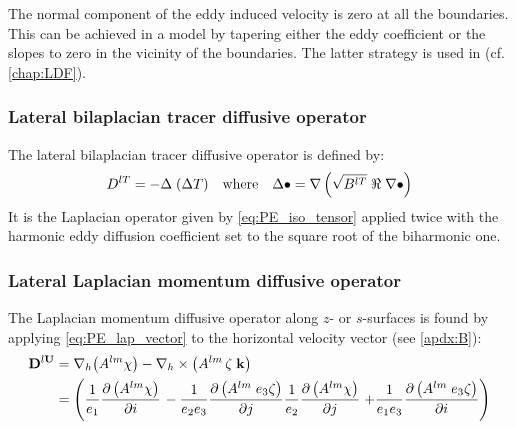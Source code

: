 \documentclass[../main/NEMO_manual]{subfiles}
\begin{document}
The normal component of the eddy induced velocity is zero at all the boundaries.
This can be achieved in a model by tapering either the eddy coefficient or the slopes to zero in the vicinity of
the boundaries.
The latter strategy is used in \NEMO (cf. \autoref{chap:LDF}).

\subsubsection{Lateral bilaplacian tracer diffusive operator}

The lateral bilaplacian tracer diffusive operator is defined by:
\[
  D^{lT}= - \Delta \; (\Delta T) \quad \text{where} \quad
  \Delta \bullet = \nabla \lt( \sqrt{B^{lT}} \; \Re \; \nabla \bullet \rt)
\]
It is the Laplacian operator given by \autoref{eq:PE_iso_tensor} applied twice with
the harmonic eddy diffusion coefficient set to the square root of the biharmonic one.

\subsubsection{Lateral Laplacian momentum diffusive operator}

The Laplacian momentum diffusive operator along $z$- or $s$-surfaces is found by
applying \autoref{eq:PE_lap_vector} to the horizontal velocity vector (see \autoref{apdx:B}):
\begin{align*}
  \vect D^{l \vect U} &=   \nabla_h        \big( A^{lm}    \chi             \big)
                         - \nabla_h \times \big( A^{lm} \, \zeta \; \vect k \big) \\
                      &= \lt(   \frac{1}{e_1}     \pd[ \lt( A^{lm}    \chi      \rt) ]{i} \rt.
                              - \frac{1}{e_2 e_3} \pd[ \lt( A^{lm} \; e_3 \zeta \rt) ]{j}
                                \frac{1}{e_2}     \pd[ \lt( A^{lm}    \chi      \rt) ]{j}
                         \lt. + \frac{1}{e_1 e_3} \pd[ \lt( A^{lm} \; e_3 \zeta \rt) ]{i} \rt)
\end{align*}
\end{document}
